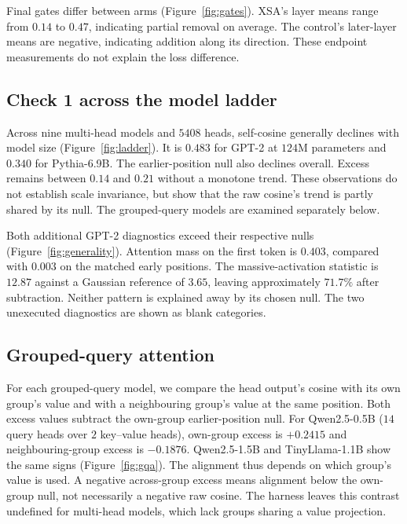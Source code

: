 \documentclass{article} %
\begin{document}
Final gates differ between arms (Figure~\ref{fig:gates}). XSA's layer means
range from $0.14$ to $0.47$, indicating partial removal on average.
The control's later-layer means are negative, indicating addition along
its direction. These endpoint measurements do not explain the loss difference.

\subsection{Check 1 across the model ladder}
\label{sec:ladder}

Across nine multi-head models and $5408$ heads, self-cosine generally
declines with model size (Figure~\ref{fig:ladder}). It is $0.483$ for
GPT-2 at $124$M parameters and $0.340$ for Pythia-6.9B. The earlier-position
null also declines overall. Excess remains between $0.14$ and $0.21$
without a monotone trend. These observations do not establish scale
invariance, but show that the raw cosine's trend is partly shared by its
null. The grouped-query models are examined separately below.

Both additional GPT-2 diagnostics exceed their respective nulls
(Figure~\ref{fig:generality}). Attention mass on the first token is
$0.403$, compared with $0.003$ on the matched early positions. The
massive-activation statistic is $12.87$ against a Gaussian reference of
$3.65$, leaving approximately $71.7\%$ after subtraction. Neither pattern
is explained away by its chosen null. The two unexecuted diagnostics are
shown as blank categories.

\subsection{Grouped-query attention}
\label{sec:gqa}

For each grouped-query model, we compare the head output's cosine with its
own group's value and with a neighbouring group's value at the same position.
Both excess values subtract the own-group earlier-position null. For
Qwen2.5-0.5B ($14$ query heads over $2$ key--value heads), own-group excess
is $+0.2415$ and neighbouring-group excess is $-0.1876$. Qwen2.5-1.5B
and TinyLlama-1.1B show the same signs (Figure~\ref{fig:gqa}). The
alignment thus depends on which group's value is used. A negative
across-group excess means alignment below the own-group null, not
necessarily a negative raw cosine. The harness leaves this contrast
undefined for multi-head models, which lack groups sharing a value
projection.
\end{document}
